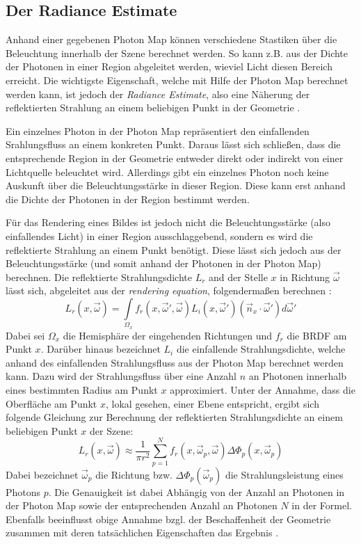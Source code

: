 \documentclass[a4paper,twocolumn,abstracton]{scrartcl}
\begin{document}
\subsection{Der Radiance Estimate}
Anhand einer gegebenen Photon Map können verschiedene Stastiken über die Beleuchtung innerhalb der Szene berechnet werden. So kann z.B. aus der Dichte der Photonen in einer Region abgeleitet werden, wieviel Licht diesen Bereich erreicht. Die wichtigste Eigenschaft, welche mit Hilfe der Photon Map berechnet werden kann, ist jedoch der \emph{Radiance Estimate}, also eine Näherung der reflektierten Strahlung an einem beliebigen Punkt in der Geometrie \citep{Jensen2001}.

Ein einzelnes Photon in der Photon Map repräsentiert den einfallenden Srahlungsfluss an einem konkreten Punkt. Daraus lässt sich schließen, dass die entsprechende Region in der Geometrie entweder direkt oder indirekt von einer Lichtquelle beleuchtet wird. Allerdings gibt ein einzelnes Photon noch keine Auskunft über die Beleuchtungsstärke in dieser Region. Diese kann erst anhand die Dichte der Photonen in der Region bestimmt werden.

Für das Rendering eines Bildes ist jedoch nicht die Beleuchtungsstärke (also einfallendes Licht) in einer Region ausschlaggebend, sondern es wird die reflektierte Strahlung an einem Punkt benötigt. Diese lässt sich jedoch aus der Beleuchtungsstärke (und somit anhand der Photonen in der Photon Map) berechnen. Die reflektierte Strahlungsdichte $L_r$ and der Stelle $x$ in Richtung $\vec{\omega}$ lässt sich, abgeleitet aus der \emph{rendering equation}, folgendermaßen berechnen \citep{Jensen2001, Shirley2005}:
\begin{displaymath}
L_r(x,\vec{\omega}) = \int\limits_{\Omega_x} f_r(x,\vec{\omega}',\vec{\omega}) L_i(x,\vec{\omega}') (\vec{n}_x \cdot \vec{\omega}') d\vec{\omega}'
\end{displaymath}
Dabei sei $\Omega_x$ die Hemisphäre der eingehenden Richtungen und $f_r$ die BRDF am Punkt $x$. Darüber hinaus bezeichnet $L_i$ die einfallende Strahlungsdichte, welche anhand des einfallenden Strahlungsfluss aus der Photon Map berechnet werden kann. Dazu wird der Strahlungsfluss über eine Anzahl $n$ an Photonen innerhalb eines bestimmten Radius am Punkt $x$ approximiert. Unter der Annahme, dass die Oberfläche am Punkt $x$, lokal gesehen, einer Ebene entspricht, ergibt sich folgende Gleichung zur Berechnung der reflektierten Strahlungsdichte an einem beliebigen Punkt $x$ der Szene:
\begin{displaymath}
L_r(x,\vec{\omega})\approx\frac{1}{\pi r^2}\sum\limits_{p=1}^{N}f_r(x,\vec{\omega}_p,\vec{\omega})\Delta\Phi_p(x,\vec{\omega}_p)
\end{displaymath}
Dabei bezeichnet $\vec{\omega}_p$ die Richtung bzw. $\Delta\Phi_p(\vec{\omega}_p)$ die Strahlungsleistung eines Photons $p$. Die Genauigkeit ist dabei Abhängig von der Anzahl an Photonen in der Photon Map sowie der entsprechenden Anzahl an Photonen $N$ in der Formel. Ebenfalls beeinflusst obige Annahme bzgl. der Beschaffenheit der Geometrie zusammen mit deren tatsächlichen Eigenschaften das Ergebnis \citep{Jensen2001}.
\end{document}
